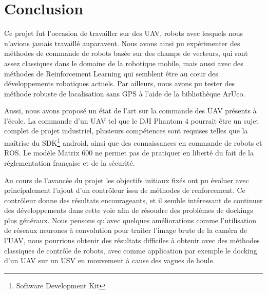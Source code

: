 \section{Conclusion}

Ce projet fut l’occasion de travailler sur des UAV, robots avec lesquels nous n'avions jamais travaillé auparavent. Nous avons ainsi pu expérimenter des méthodes de commande de robots basée sur des champs de vecteurs, qui sont assez classiques dans le domaine de la robotique mobile, mais aussi avec des méthodes de Reinforcement Learning qui semblent être au c\oe ur des développements robotiques actuels. Par ailleurs, nous avons pu tester des méthode robuste de localisation sans GPS à l’aide de la bibliothèque ArUco. 

Aussi, nous avons proposé un état de l’art sur la commande des UAV présents à l’école. La commande d’un UAV tel que le DJI Phantom 4 pourrait être un sujet complet de projet industriel, plusieurs compétences sont requises telles que la maîtrise du SDK\footnote{Software Development Kit} android, ainsi que des connaissances en commande de robots et ROS. Le modèle Matrix 600 ne permet pas de pratiquer en liberté du fait de la réglementation française et de la sécurité. 

Au cours de l’avancée du projet les objectifs initiaux fixés ont pu évoluer avec principalement l’ajout d’un contrôleur issu de méthodes de renforcement. Ce contrôleur donne des résultats encourageants, et il semble intéressant de continuer des développements dans cette voie afin de résoudre des problèmes de dockings plus généraux. Nous pensons qu’avec quelques améliorations comme l’utilisation de réseaux neurones à  convolution pour traiter l’image brute de la caméra de l'UAV, nous pourrions obtenir des résultats difficiles à obtenir avec des méthodes classiques de contrôle de robots, avec comme application par exemple le docking d’un UAV sur un USV en mouvement à cause des vagues de houle.